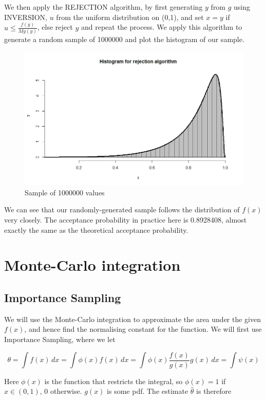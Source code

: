 \documentclass[11pt, a4paper]{article}
\begin{document}
We then apply the REJECTION algorithm, by first generating $y$ from $g$ using INVERSION, $u$ from the uniform distribution on (0,1), and set $x=y$ if $u \le \frac{f(y)}{Mg(y)}$, else reject $y$ and repeat the process. We apply this algorithm to generate a random sample of 1000000 and plot the histogram of our sample.

\begin{figure}[H]
\centering
	\includegraphics[scale=0.4]{1hist.jpeg}
\caption{Sample of 1000000 values}
\end{figure}

We can see that our randomly-generated sample follows the distribution of $f(x)$ very closely. The acceptance probability in practice here is 0.8928408, almost exactly the same as the theoretical acceptance probability.


\section{Monte-Carlo integration}

\subsection{Importance Sampling}

We will use the Monte-Carlo integration to approximate the area under the given $f(x)$, and hence find the normalising constant for the function. We will first use Importance Sampling, where we let

$$ \theta = \int f(x) \,dx = \int \phi(x)f(x) \,dx = \int \phi(x) \dfrac{f(x)}{g(x)} g(x) \,dx = \int \psi(x)$$

Here $\phi(x)$ is the function that restricts the integral, so $\phi(x) = 1$ if $x \in (0,1)$, 0 otherwise. $g(x)$ is some pdf. The estimate $\hat{\theta}$ is therefore
\end{document}
